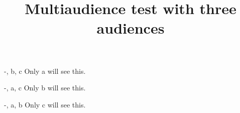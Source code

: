 \documentclass{article}
\title{Multiaudience test with three audiences}
\author{}
\date{}
\begin{document}
\maketitle


\begin{shownto}{-, b, c}
    Only a will see this.
\end{shownto}
\begin{shownto}{-, a, c}
    Only b will see this.
\end{shownto}
\begin{shownto}{-, a, b}
    Only c will see this.
\end{shownto}
\end{document}
